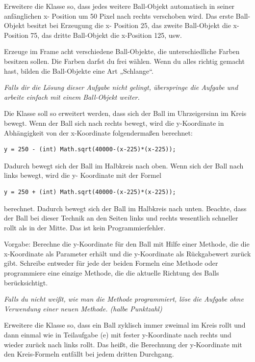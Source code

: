 \begin{compactenum}[a)]
\item Erweitere die Klasse  so, dass jedes weitere Ball-Objekt
automatisch in seiner anfänglichen x- Position um 50 Pixel nach rechts
verschoben wird. Das erste Ball-Objekt besitzt bei Erzeugung die x- Position
25, das zweite Ball-Objekt die x-Position 75, das dritte Ball-Objekt die
x-Position 125, usw.

Erzeuge im Frame acht verschiedene Ball-Objekte, die unterschiedliche Farben
besitzen sollen. Die Farben darfst du frei wählen. Wenn du alles richtig
gemacht hast, bilden die Ball-Objekte eine Art „Schlange“.

\emph{Falls dir die Lösung dieser Aufgabe nicht gelingt, überspringe die Aufgabe
und arbeite einfach mit einem Ball-Objekt weiter.}

\item Die Klasse  soll so erweitert werden, dass sich der Ball im
Uhrzeigersinn im Kreis bewegt. Wenn der Ball sich nach rechts bewegt, wird die
y-Koordinate in Abhängigkeit von der x-Koordinate folgendermaßen berechnet:

\begin{lstlisting}
y = 250 - (int) Math.sqrt(40000-(x-225)*(x-225));
\end{lstlisting}

Dadurch bewegt sich der Ball im Halbkreis nach oben. Wenn sich der Ball nach
links bewegt, wird die y- Koordinate mit der Formel

\begin{lstlisting}
y = 250 + (int) Math.sqrt(40000-(x-225)*(x-225));
\end{lstlisting}

berechnet. Dadurch bewegt sich der Ball im Halbkreis nach unten. Beachte, dass
der Ball bei dieser Technik an den Seiten links und rechts wesentlich schneller
rollt als in der Mitte. Das ist kein Programmierfehler.

Vorgabe: Berechne die y-Koordinate für den Ball mit Hilfe einer Methode, die
die x-Koordinate als Parameter erhält und die y-Koordinate als Rückgabewert
zurück gibt. Schreibe entweder für jede der beiden Formeln eine Methode oder
programmiere eine einzige Methode, die die aktuelle Richtung des Balls
berücksichtigt.

\emph{Falls du nicht weißt, wie man die Methode programmiert, löse die Aufgabe
ohne Verwendung einer neuen Methode. (halbe Punktzahl)}

\item Erweitere die Klasse  so, dass ein Ball zyklisch immer
zweimal im Kreis rollt und dann einmal wie in Teilaufgabe (e) mit fester
y-Koordinate nach rechts und wieder zurück nach links rollt. Das heißt, die
Berechnung der y-Koordinate mit den Kreis-Formeln entfällt bei jedem dritten
Durchgang.
\end{compactenum}